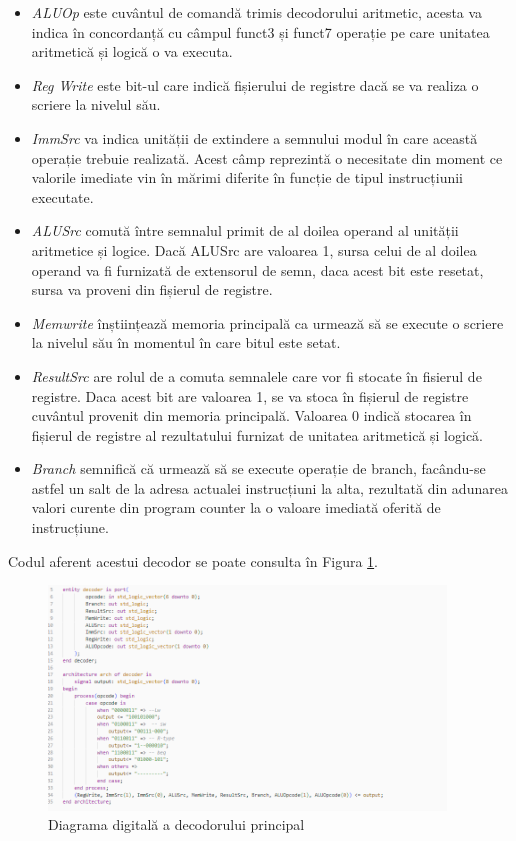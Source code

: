 \documentclass[12pt]{article}
\begin{document}
\begin{itemize}
\item \textit{ALUOp} este cuvântul de comandă trimis decodorului aritmetic, acesta va indica în concordanță cu câmpul funct3 și funct7 operație pe care unitatea aritmetică și logică o va executa.
\item \textit{Reg Write} este bit-ul care indică fișierului de registre dacă se va realiza o scriere la nivelul său.
\item \textit{ImmSrc} va indica unității de extindere a semnului modul în care această operație trebuie realizată. Acest câmp reprezintă o necesitate din moment ce valorile imediate vin în mărimi diferite în funcție de tipul instrucțiunii executate.
\item \textit{ALUSrc} comută între semnalul primit de al doilea operand al unității aritmetice și logice. Dacă ALUSrc are valoarea 1, sursa celui de al doilea operand va fi furnizată de extensorul de semn, daca acest bit este resetat, sursa va proveni din fișierul de registre. 
\item \textit{Memwrite} înștiințează memoria principală ca urmează să se execute o scriere la nivelul său în momentul în care bitul este setat.
\item \textit{ResultSrc} are rolul de a comuta semnalele care vor fi stocate în fisierul de registre. Daca acest bit are valoarea 1, se va stoca în fișierul de registre cuvântul provenit din memoria principală. Valoarea 0 indică stocarea în fișierul de registre al rezultatului furnizat de unitatea aritmetică și logică.

\item \textit{Branch} semnifică că urmează să se execute operație de branch, facându-se astfel un salt de la adresa actualei instrucțiuni la alta, rezultată din adunarea valori curente din program counter la o valoare imediată oferită de instrucțiune.
\end{itemize}

Codul aferent acestui decodor se poate consulta în Figura \ref{Figura:47}.

\newpage

 \begin{figure}[h!]
 \includegraphics[width=0.94\textwidth]{decodercode.png}
 \centering
 \caption{Diagrama digitală a decodorului principal}
 \label{Figura:47}
 \end{figure}
 
\end{document}

